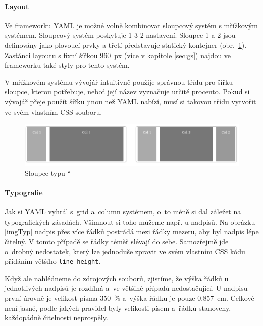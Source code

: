 \documentclass[thesis=B,czech]{FITthesis}[2012/06/26]
\begin{document}
\paragraph{Layout}

Ve frameworku \gls{YAML} je možné volně kombinovat sloupcový systém s mřížkovým systémem. Sloupcový systém poskytuje 1-3-2 nastavení. Sloupce 1 a 2 jsou definovány jako plovoucí prvky a třetí představuje statický kontejner (obr.~\ref{imgCol}). Zastánci layoutu s fixní šířkou 960~px (více v kapitole \ref{sec:gs}) najdou ve frameworku také styly pro tento systém. 

V mřížkovém systému vývojář intuitivně použije správnou třídu pro šířku sloupce, kterou potřebuje, neboť její název vyznačuje určité procento. Pokud si vývojář přeje použít šířku jinou než \gls{YAML} nabízí, musí si takovou třídu vytvořit ve svém vlastním \gls{CSS} souboru.  

\begin{figure}[h]
	\begin{center}
	\includegraphics[scale=0.6]{images/image05.png}
	\end{center}
	\caption{Sloupce typu \textquotedblleft \cite{yaml}}
	\label{imgCol}
\end{figure}

\paragraph{Typografie}

Jak si \gls{YAML} vyhrál s~grid a~column systémem, o~to méně si dal záležet na typografických zásadách. Všimnout si toho můžeme např. u nadpisů. Na obrázku \ref{imgTyp} nadpis přes více řádků postrádá mezi řádky mezeru, aby byl nadpis lépe čitelný. V tomto případě se řádky téměř slévají do sebe. Samozřejmě jde o~drobný nedostatek, který lze jednoduše zpravit ve svém vlastním \gls{CSS} kódu přidáním většího \verb#line-height#.

Když ale nahlédneme do zdrojových souborů, zjistíme, že výška řádků u jednotlivých nadpisů je rozdílná a~ve většině případů nedostačující. U nadpisu první úrovně je velikost písma 350~\% a~výška řádku je pouze 0.857~em. Celkově není jasné, podle jakých pravidel byly velikosti písem a~řádků stanoveny, každopádně čitelnosti neprospěly.
\end{document}
